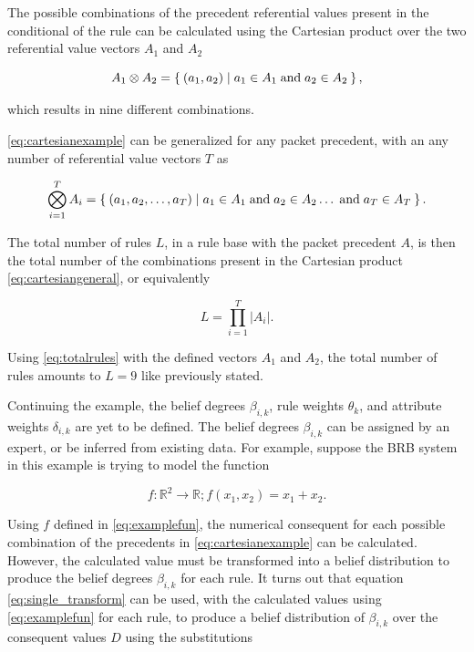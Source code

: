 The possible combinations of the precedent referential values present in the conditional of the rule can be calculated using the Cartesian product
over the two referential value vectors $A_1$ and $A_2$

\begin{equation}
    \label{eq:cartesianexample}
    A_1 \otimes A_2 = \Set{(a_1, a_2) \mid a_1 \in A_1\;\text{and}\;a_2 \in A_2},
\end{equation}

which results in nine different combinations.

\eqref{eq:cartesianexample} can be generalized for any packet precedent, with an any
number of referential value vectors $T$ as

\begin{equation}
    \label{eq:cartesiangeneral}
    \bigotimes_{i=1}^{T} A_i = \Set{(a_1, a_2, \dots, a_T) \mid a_1 \in A_1\;\text{and}\;a_2 \in A_2\dots\;\text{and}\;a_T \in A_T}.
\end{equation}

The total number of rules $L$, in a rule base with the packet precedent $A$, is then the total number of the combinations present in the Cartesian product 
\eqref{eq:cartesiangeneral}, or equivalently

\begin{equation}
    \label{eq:totalrules}
    L = \prod_{i=1}^T\left|A_i\right|.
\end{equation}

Using \eqref{eq:totalrules} with the defined vectors $A_1$ and $A_2$, the total number of rules amounts to $L=9$ like previously stated.

Continuing the example, the belief degrees $\beta_{i,k}$, rule weights $\theta_k$, and attribute weights $\delta_{i,k}$ are yet to be defined.
The belief degrees $\beta_{i,k}$ can be assigned by an expert, or be inferred from existing data. For example, suppose the BRB system in this example
is trying to model the function

\begin{equation}
    \label{eq:examplefun}
    f: \mathbb{R}^2 \to \mathbb{R}; f(x_1, x_2) = x_1 + x_2. 
\end{equation}

Using $f$ defined in \eqref{eq:examplefun}, the numerical consequent for each possible combination of the precedents in \eqref{eq:cartesianexample} can
be calculated. However, the calculated value must be transformed into a belief distribution to produce the belief degrees $\beta_{i,k}$ for each
rule. It turns out that equation \eqref{eq:single_transform} can be used, with the calculated values using \eqref{eq:examplefun} for each rule,
to produce a belief distribution of $\beta_{i, k}$ over
the consequent values $D$ using the substitutions

